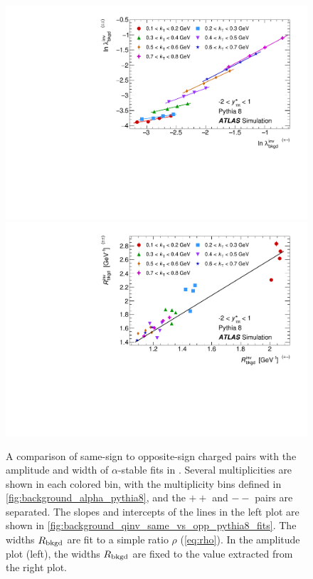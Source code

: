\begin{figure}[t]
\begin{minipage}[t]{1.0\textwidth}
\centering
\includegraphics[width=.49\linewidth]{qinv_pythia8_backLambda_kt_opp_vs_same.pdf}
\includegraphics[width=.49\linewidth]{qinv_pythia8_backR_kt_opp_vs_same.pdf}
\end{minipage}
\caption{A comparison of same-sign to opposite-sign charged pairs with the amplitude and width of $\alpha$-stable fits in . Several multiplicities are shown in each colored \kt bin, with the multiplicity bins defined in \cref{fig:background_alpha_pythia8}, and the $++$ and $--$ pairs are separated. The slopes and intercepts of the lines in the left plot are shown in \cref{fig:background_qinv_same_vs_opp_pythia8_fits}. The widths $R_{\mathrm{bkgd}}$ are fit to a simple ratio $\rho$ (\cref{eq:rho}). In the amplitude plot (left), the widths $R_{\mathrm{bkgd}}$ are fixed to the value extracted from the right plot.}
\label{fig:background_qinv_same_vs_opp_pythia8}
\end{figure}

